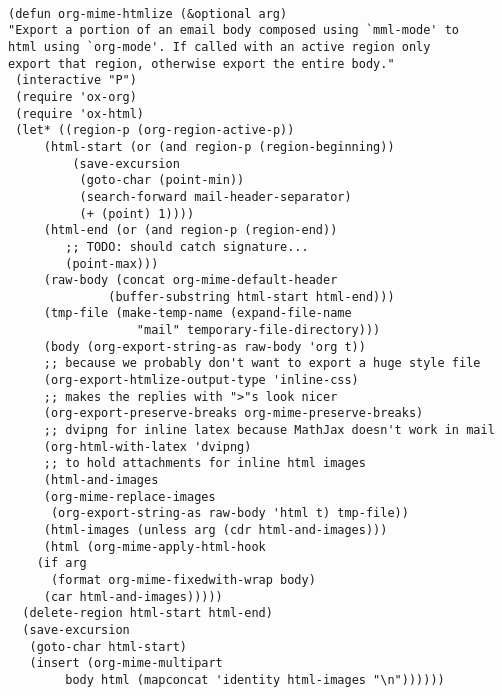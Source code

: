 \documentclass[11pt]{article}
\begin{document}
\begin{verbatim}

(defun org-mime-htmlize (&optional arg)
"Export a portion of an email body composed using `mml-mode' to
html using `org-mode'. If called with an active region only
export that region, otherwise export the entire body."
 (interactive "P")
 (require 'ox-org)
 (require 'ox-html)
 (let* ((region-p (org-region-active-p))
     (html-start (or (and region-p (region-beginning))
	     (save-excursion
	      (goto-char (point-min))
	      (search-forward mail-header-separator)
	      (+ (point) 1))))
     (html-end (or (and region-p (region-end))
	    ;; TODO: should catch signature...
	    (point-max)))
     (raw-body (concat org-mime-default-header
			  (buffer-substring html-start html-end)))
     (tmp-file (make-temp-name (expand-file-name
				  "mail" temporary-file-directory)))
     (body (org-export-string-as raw-body 'org t))
     ;; because we probably don't want to export a huge style file
     (org-export-htmlize-output-type 'inline-css)
     ;; makes the replies with ">"s look nicer
     (org-export-preserve-breaks org-mime-preserve-breaks)
	 ;; dvipng for inline latex because MathJax doesn't work in mail
	 (org-html-with-latex 'dvipng)
     ;; to hold attachments for inline html images
     (html-and-images
     (org-mime-replace-images
	  (org-export-string-as raw-body 'html t) tmp-file))
     (html-images (unless arg (cdr html-and-images)))
     (html (org-mime-apply-html-hook
	(if arg
	  (format org-mime-fixedwith-wrap body)
	 (car html-and-images)))))
  (delete-region html-start html-end)
  (save-excursion
   (goto-char html-start)
   (insert (org-mime-multipart
	    body html (mapconcat 'identity html-images "\n"))))))
\end{verbatim}
\label{sec:orgc4e2c3f}
\end{document}
